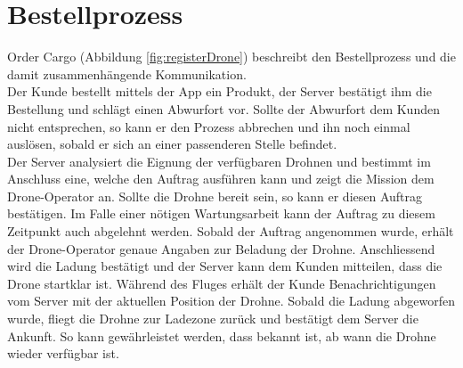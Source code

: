 {\section{Bestellprozess}

Order Cargo (Abbildung \ref{fig:registerDrone}) beschreibt den Bestellprozess und die damit zusammenhängende Kommunikation. \\

Der Kunde bestellt mittels der App ein Produkt, der Server bestätigt ihm die Bestellung und schlägt einen Abwurfort vor. Sollte der Abwurfort dem Kunden nicht entsprechen, so kann er den Prozess abbrechen und ihn noch einmal auslösen, sobald er sich an einer passenderen Stelle befindet.\\

Der Server analysiert die Eignung der verfügbaren Drohnen und bestimmt im Anschluss eine, welche den Auftrag ausführen kann und zeigt die Mission dem Drone-Operator an. Sollte die Drohne bereit sein, so kann er diesen Auftrag bestätigen. Im Falle einer nötigen Wartungsarbeit kann der Auftrag zu diesem Zeitpunkt auch abgelehnt werden. Sobald der Auftrag angenommen wurde, erhält der Drone-Operator genaue Angaben zur Beladung der Drohne. Anschliessend wird die Ladung bestätigt und der Server kann dem Kunden mitteilen, dass die Drone startklar ist. Während des Fluges erhält der Kunde Benachrichtigungen vom Server mit der aktuellen Position der Drohne. Sobald die Ladung abgeworfen wurde, fliegt die Drohne zur Ladezone zurück und bestätigt dem Server die Ankunft. So kann gewährleistet werden, dass bekannt ist, ab wann die Drohne wieder verfügbar ist. \\

}
